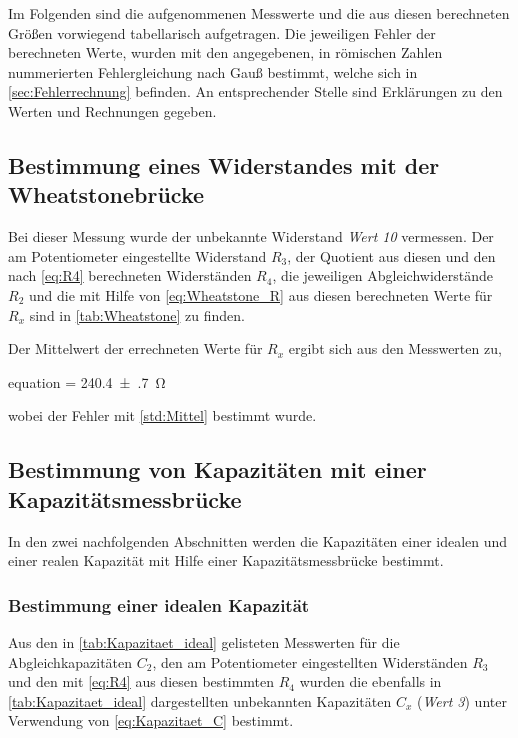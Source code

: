 Im Folgenden sind die aufgenommenen Messwerte und die aus diesen
berechneten Größen vorwiegend tabellarisch aufgetragen. Die jeweiligen Fehler der berechneten Werte, wurden mit den angegebenen, in römischen Zahlen nummerierten Fehlergleichung nach Gauß bestimmt, welche sich in 
\cref{sec:Fehlerrechnung} befinden.
An entsprechender Stelle sind Erklärungen zu den Werten und Rechnungen gegeben. 

\subsection{Bestimmung eines Widerstandes mit der Wheatstonebrücke}
\label{sec:Auswertung_Wheatstone}

	Bei dieser Messung wurde der unbekannte Widerstand \emph{Wert 10} vermessen.
	Der am Potentiometer eingestellte Widerstand $R_{3}$, der Quotient aus diesen und den nach \cref{eq:R4} berechneten
	Widerständen $R_{4}$, die jeweiligen
	Abgleichwiderstände $R_{2}$ und die mit Hilfe von \cref{eq:Wheatstone_R} aus diesen
	berechneten Werte für $R_{x}$ sind in \cref{tab:Wheatstone} zu finden.
	
	
	
	Der Mittelwert der errechneten Werte für $R_{x}$ ergibt sich aus den Messwerten zu,
	\begin{empheq}{equation}
		 = \SI{240.4(7)}{\ohm}
	\end{empheq}
	wobei der Fehler mit \cref{std:Mittel} bestimmt wurde.
	
\subsection{Bestimmung von Kapazitäten mit einer Kapazitätsmessbrücke}
\label{sec:Auswertung_Kapazitaet}
	In den zwei nachfolgenden Abschnitten werden die Kapazitäten einer 
	idealen und einer realen Kapazität mit Hilfe einer Kapazitätsmessbrücke
	bestimmt.
	
	\subsubsection{Bestimmung einer idealen Kapazität}
	\label{sec:Auswertung_Kapazität_ideal}
		Aus den in \cref{tab:Kapazitaet_ideal} gelisteten Messwerten für die Abgleichkapazitäten
		$C_{2}$, den am Potentiometer eingestellten Widerständen $R_{3}$ und den mit \cref{eq:R4} 
		aus diesen bestimmten $R_{4}$ wurden die ebenfalls in \cref*{tab:Kapazitaet_ideal} dargestellten
		unbekannten Kapazitäten $C_{x}$ (\emph{Wert 3}) unter Verwendung von \cref{eq:Kapazitaet_C} bestimmt. 
		
